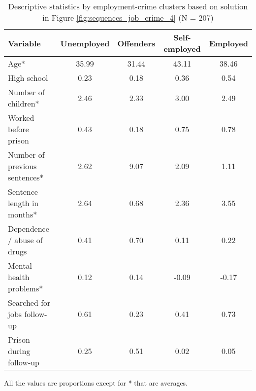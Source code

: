 \begin{table}[htp]
\footnotesize
\setlength{\tabcolsep}{10pt}
\renewcommand{\arraystretch}{1.3}
\begin{threeparttable}
\centering
\caption{Descriptive statistics by employment-crime clusters \newline based on solution in Figure \ref{fig:sequences_job_crime_4} (N = 207)} 
\label{tab:descriptives_job_crime_4}
\begin{tabular}{lcccc}
  \hline
Variable & Unemployed & Offenders & Self-employed & Employed \\ 
  \hline
Age* & 35.99 & 31.44 & 43.11 & 38.46 \\ 
  High school & 0.23 & 0.18 & 0.36 & 0.54 \\ 
  Number of children* & 2.46 & 2.33 & 3.00 & 2.49 \\ 
  Worked before prison & 0.43 & 0.18 & 0.75 & 0.78 \\ 
  Number of previous sentences* & 2.62 & 9.07 & 2.09 & 1.11 \\ 
  Sentence length in months* & 2.64 & 0.68 & 2.36 & 3.55 \\ 
  Dependence / abuse of drugs & 0.41 & 0.70 & 0.11 & 0.22 \\ 
  Mental health problems* & 0.12 & 0.14 & -0.09 & -0.17 \\ 
  Searched for jobs follow-up & 0.61 & 0.23 & 0.41 & 0.73 \\ 
  Prison during follow-up & 0.25 & 0.51 & 0.02 & 0.05 \\ 
   \hline
\end{tabular}
\begin{tablenotes}
\scriptsize
\item All the values are proportions except for * that are averages.
\end{tablenotes}
\end{threeparttable}
\end{table}
